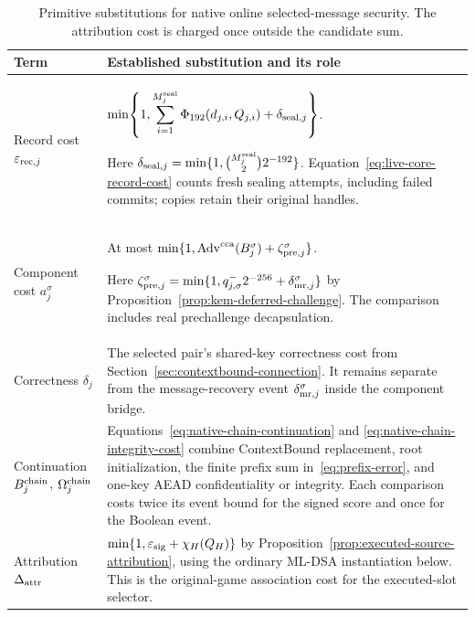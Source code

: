 \documentclass[pdflatex]{sn-jnl}
\theoremstyle{thmstyleone}
\theoremstyle{thmstylethree}
\theoremstyle{thmstyletwo}
\begin{document}
\begin{table}[htbp]
\caption{Primitive substitutions for native online selected-message security.
The attribution cost is charged once outside the candidate sum.}
\label{tab:native-online-substitutions}
\small
\begin{tabularx}{\textwidth}{@{}L{0.19\textwidth}Y@{}}
\toprule
Term & Established substitution and its role \\
\midrule
Record cost $\varepsilon_{{\rm rec},j}$ &
$\displaystyle\min\!\left\{1,
\sum_{i=1}^{M_j^{\rm seal}}\Phi_{192}(d_{j,i},Q_{j,i})
+\delta_{{\rm seal},j}\right\}$.
\par Here $\delta_{{\rm seal},j}=\min\{1,\binom{M_j^{\rm seal}}2 2^{-192}\}$.
Equation~\eqref{eq:live-core-record-cost} counts fresh sealing attempts,
including failed commits; copies retain their original handles. \\
\addlinespace[3pt]
Component cost $a_j^\sigma$ &
At most $\min\{1,\operatorname{Adv}^{\rm cca}(B_j^\sigma)
+\zeta_{{\rm pre},j}^{\sigma}\}$.
\par Here
$\zeta_{{\rm pre},j}^{\sigma}
=\min\{1,q_{j,\sigma}^{-}2^{-256}+\delta_{{\rm mr},j}^{\sigma}\}$
by Proposition~\ref{prop:kem-deferred-challenge}.
The comparison includes real prechallenge decapsulation. \\
\addlinespace[3pt]
Correctness $\delta_j$ &
The selected pair's shared-key correctness cost from
Section~\ref{sec:contextbound-connection}. It remains separate from the
message-recovery event $\delta_{{\rm mr},j}^{\sigma}$ inside the component
bridge. \\
\addlinespace[3pt]
Continuation $B_j^{\rm chain}$,
$\Omega_j^{\rm chain}$ &
Equations~\eqref{eq:native-chain-continuation} and
\eqref{eq:native-chain-integrity-cost} combine ContextBound replacement,
root initialization, the finite prefix sum in~\eqref{eq:prefix-error},
and one-key AEAD confidentiality or integrity. Each comparison costs twice
its event bound for the signed score and once for the Boolean event. \\
\addlinespace[3pt]
Attribution $\Delta_{\rm attr}$ &
$\min\{1,\varepsilon_{\rm sig}+\chi_H(Q_H)\}$ by
Proposition~\ref{prop:executed-source-attribution}, using the ordinary
ML-DSA instantiation below. This is the original-game association cost
for the executed-slot selector. \\
\bottomrule
\end{tabularx}
\end{table}
\end{document}
